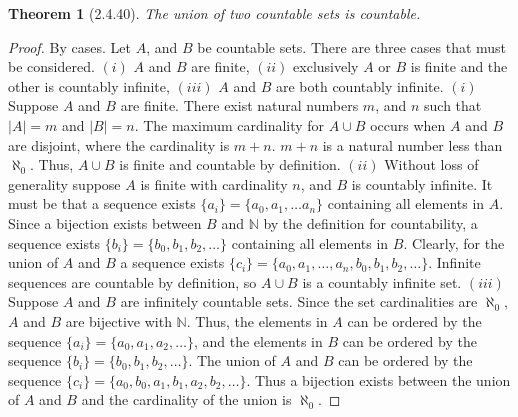 \documentclass[a4paper, 12pt]{article}
\theoremstyle{plain}
\newtheorem*{theorem*}{Theorem}
\begin{document}
	
	\begin{theorem*}[2.4.40]
		The union of two countable sets is countable.
	\end{theorem*}
	
	\begin{proof}
		By cases. Let $A$, and $B$ be countable sets. There are three cases that must be considered. $(i)$ $A$ and $B$ are finite, $(ii)$ exclusively $A$ or $B$ is finite and the other is countably infinite, $(iii)$ $A$ and $B$ are both countably infinite.
		\newline
		\newline
		$(i)$ Suppose $A$ and $B$ are finite. There exist natural numbers $m$, and $n$ such that $|A| = m$ and $|B| = n$. The maximum cardinality for $A \cup B$ occurs when $A$ and $B$ are disjoint, where the cardinality is $m + n$. $m+n$ is a natural number less than $\aleph_0$. Thus, $A \cup B$ is finite and countable by definition. 
		\newline
		\newline
		$(ii)$ Without loss of generality suppose $A$ is finite with cardinality $n$, and $B$ is countably infinite. It must be that a sequence exists $\{a_i\} = \{a_0, a_1, \dots a_n\}$ containing all elements in $A$. Since a bijection exists between $B$ and $\mathbb{N}$ by the definition for countability, a sequence exists $\{b_i\} = \{b_0, b_1, b_2, \dots \}$ containing all elements in $B$. Clearly, for the union of $A$ and $B$ a sequence exists $\{c_i\} = \{a_0, a_1, \dots, a_n, b_0, b_1, b_2, \dots \}$. Infinite sequences are countable by definition, so $A \cup B$ is a countably infinite set.
		\newline
		\newline
		$(iii)$ Suppose $A$ and $B$ are infinitely countable sets. Since the set cardinalities are $\aleph_0$, $A$ and $B$ are bijective with $\mathbb{N}$. Thus, the elements in $A$ can be ordered by the sequence $\{a_i\} = \{a_0, a_1, a_2, \dots\}$, and the elements in $B$ can be ordered by the sequence $\{b_i\} = \{b_0, b_1, b_2, \dots \}$. The union of $A$ and $B$ can be ordered by the sequence $\{c_i\} = \{a_0, b_0, a_1, b_1, a_2, b_2, \dots\}$. Thus a bijection exists between the union of $A$ and $B$ and the cardinality of the union is $\aleph_0$.
	\end{proof}
\end{document}
